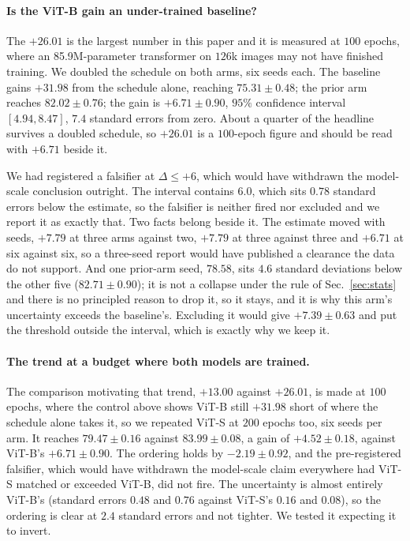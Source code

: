 \paragraph{Is the ViT-B gain an under-trained baseline?} The $+26.01$ is the
largest number in this paper and it is measured at $100$ epochs, where an
85.9M-parameter transformer on $126$k images may not have finished training. We
doubled the schedule on both arms, six seeds each.
The baseline gains $+31.98$ from the schedule alone, reaching $75.31 \pm 0.48$;
the prior arm reaches $82.02 \pm 0.76$; the gain is $+6.71 \pm 0.90$, $95\%$
confidence interval $[4.94, 8.47]$, $7.4$ standard errors from zero. About a
quarter of the headline survives a doubled schedule, so $+26.01$ is a
$100$-epoch figure and should be read with $+6.71$ beside it.

 We had registered a falsifier at $\Delta \leq +6$, which would have withdrawn
the model-scale conclusion outright. The interval contains $6.0$, which sits
$0.78$ standard errors below the estimate, so the falsifier is neither fired
nor excluded and we report it as exactly that. Two facts belong beside it. The
estimate moved with seeds, $+7.79$ at three arms against two, $+7.79$ at three
against three and $+6.71$ at six against six, so a three-seed report would have
published a clearance the data do not support. And one prior-arm seed, $78.58$,
sits $4.6$ standard deviations below the other five ($82.71 \pm 0.90$); it is
not a collapse under the rule of Sec.~\ref{sec:stats} and there is no
principled reason to drop it, so it stays, and it is why this arm's uncertainty
exceeds the baseline's. Excluding it would give $+7.39 \pm 0.63$ and put the
threshold outside the interval, which is exactly why we keep it.

\paragraph{The trend at a budget where both models are trained.} The
comparison motivating that trend, $+13.00$ against $+26.01$, is made at $100$ epochs,
where the control above shows ViT-B still $+31.98$ short of where the schedule
alone takes it, so we repeated ViT-S at $200$ epochs too, six seeds per arm.
It reaches $79.47 \pm 0.16$ against $83.99 \pm 0.08$, a gain of $+4.52 \pm
0.18$, against ViT-B's $+6.71 \pm 0.90$. The ordering holds by $-2.19 \pm
0.92$, and the pre-registered falsifier, which would have withdrawn the
model-scale claim everywhere had ViT-S matched or exceeded ViT-B, did not fire.
The uncertainty is almost entirely ViT-B's (standard errors $0.48$ and $0.76$
against ViT-S's $0.16$ and $0.08$), so the ordering is clear at $2.4$ standard
errors and not tighter. We tested it expecting it to invert.

